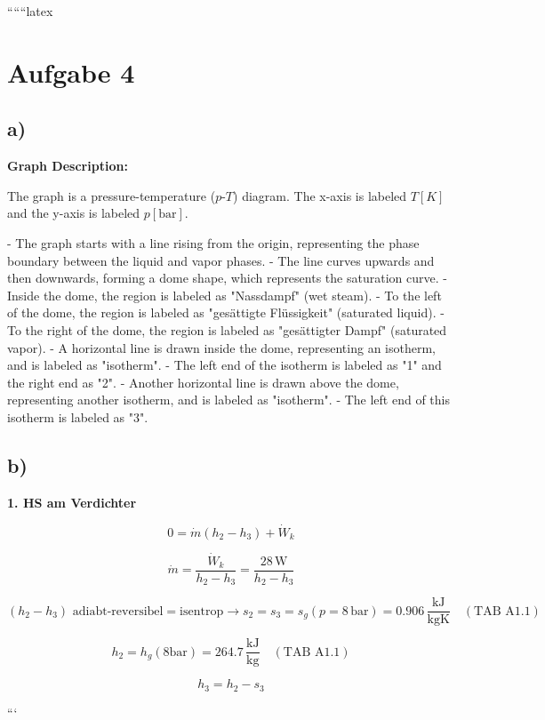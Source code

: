 
``````latex


\section*{Aufgabe 4}

\subsection*{a)}

\begin{center}
\textbf{Graph Description:}

The graph is a pressure-temperature ($p$-$T$) diagram. The x-axis is labeled $T [K]$ and the y-axis is labeled $p [\text{bar}]$. 

- The graph starts with a line rising from the origin, representing the phase boundary between the liquid and vapor phases.
- The line curves upwards and then downwards, forming a dome shape, which represents the saturation curve.
- Inside the dome, the region is labeled as "Nassdampf" (wet steam).
- To the left of the dome, the region is labeled as "gesättigte Flüssigkeit" (saturated liquid).
- To the right of the dome, the region is labeled as "gesättigter Dampf" (saturated vapor).
- A horizontal line is drawn inside the dome, representing an isotherm, and is labeled as "isotherm".
- The left end of the isotherm is labeled as "1" and the right end as "2".
- Another horizontal line is drawn above the dome, representing another isotherm, and is labeled as "isotherm".
- The left end of this isotherm is labeled as "3".

\end{center}

\subsection*{b)}

\textbf{1. HS am Verdichter}

\[
0 = \dot{m} (h_2 - h_3) + \dot{W}_k
\]

\[
\dot{m} = \frac{\dot{W}_k}{h_2 - h_3} = \frac{28 \, \text{W}}{h_2 - h_3}
\]

\[
(h_2 - h_3) \text{ adiabt-reversibel} = \text{isentrop} \rightarrow s_2 = s_3 = s_g (p = 8 \, \text{bar}) = 0.906 \, \frac{\text{kJ}}{\text{kgK}} \quad (\text{TAB A1.1})
\]

\[
h_2 = h_g (\text{8bar}) = 264.7 \, \frac{\text{kJ}}{\text{kg}} \quad (\text{TAB A1.1})
\]

\[
h_3 = h_2 - s_3
\]

```